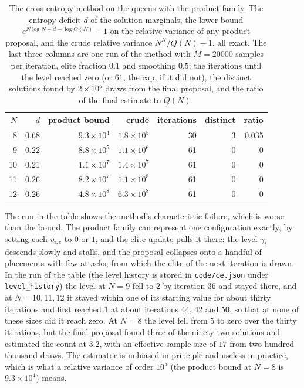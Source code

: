\begin{table}[t]
\centering
\small
\caption{The cross entropy method on the queens with the product family. The entropy deficit $d$ of the solution marginals, the lower bound $e^{N \log N - d - \log Q(N)} - 1$ on the relative variance of any product proposal, and the crude relative variance $N^N / Q(N) - 1$, all exact. The last three columns are one run of the method with $M = 20000$ samples per iteration, elite fraction $0.1$ and smoothing $0.5$: the iterations until the level reached zero (or $61$, the cap, if it did not), the distinct solutions found by $2 \times 10^5$ draws from the final proposal, and the ratio of the final estimate to $Q(N)$.}
\label{tab:ce}
\footnotesize
\begin{tabular}{rrrrrrr}
\toprule
$N$ & $d$ & product bound & crude & iterations & distinct & ratio \\
\midrule
8 & 0.68 & $9.3 \times 10^4$ & $1.8 \times 10^5$ & 30 & 3 & 0.035 \\
9 & 0.22 & $8.8 \times 10^5$ & $1.1 \times 10^6$ & 61 & 0 & 0 \\
10 & 0.21 & $1.1 \times 10^7$ & $1.4 \times 10^7$ & 61 & 0 & 0 \\
11 & 0.26 & $8.2 \times 10^7$ & $1.1 \times 10^8$ & 61 & 0 & 0 \\
12 & 0.26 & $4.8 \times 10^8$ & $6.3 \times 10^8$ & 61 & 0 & 0 \\
\bottomrule
\end{tabular}
\end{table}

The run in the table shows the method's characteristic failure, which is worse than the bound. The product family can represent one configuration exactly, by setting each $v_{i,c}$ to $0$ or $1$, and the elite update pulls it there: the level $\gamma_t$ descends slowly and stalls, and the proposal collapses onto a handful of placements with few attacks, from which the elite of the next iteration is drawn. In the run of the table (the level history is stored in \texttt{code/ce.json} under \texttt{level\_history}) the level at $N = 9$ fell to $2$ by iteration 36 and stayed there, and at $N = 10, 11, 12$ it stayed within one of its starting value for about thirty iterations and first reached $1$ at about iterations 44, 42 and 50, so that at none of these sizes did it reach zero. At $N = 8$ the level fell from $5$ to zero over the thirty iterations, but the final proposal found three of the ninety two solutions and estimated the count at $3.2$, with an effective sample size of $17$ from two hundred thousand draws. The estimator is unbiased in principle and useless in practice, which is what a relative variance of order $10^5$ (the product bound at $N = 8$ is $9.3 \times 10^4$) means.

